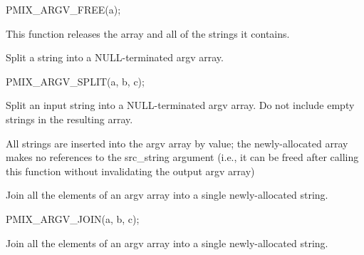 \cspecificstart
\begin{codepar}
PMIX_ARGV_FREE(a);
\end{codepar}
\cspecificend

\begin{arglist}
\end{arglist}

This function releases the array and all of the strings it contains.


Split a string into a NULL-terminated argv array.

\cspecificstart
\begin{codepar}
PMIX_ARGV_SPLIT(a, b, c);
\end{codepar}
\cspecificend

\begin{arglist}
\end{arglist}

Split an input string into a NULL-terminated argv array. Do not include empty strings in the resulting array.

\adviceuserstart
All strings are inserted into the argv array by value; the newly-allocated array makes no references to the src_string argument (i.e., it can be freed after calling this function without invalidating the output argv array)
\adviceuserend


Join all the elements of an argv array into a single newly-allocated string.

\cspecificstart
\begin{codepar}
PMIX_ARGV_JOIN(a, b, c);
\end{codepar}
\cspecificend

\begin{arglist}
\end{arglist}

Join all the elements of an argv array into a single newly-allocated string.


